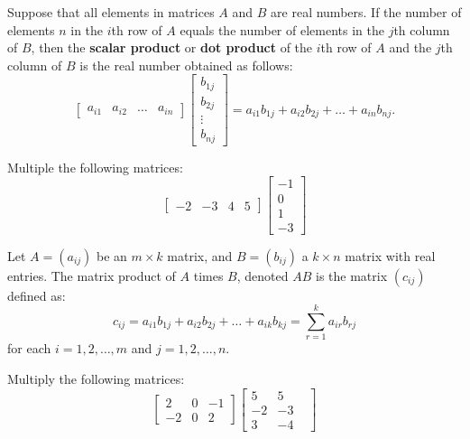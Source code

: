 \documentclass[../mathNotesPreamble]{subfiles}
\begin{document}
  \begin{defn*}
    Suppose that all elements in matrices $A$ and $B$ are real numbers. If the number of elements $n$ in the $i$th row of $A$ equals the number of elements in the $j$th column of $B$, then the \textbf{scalar product} or \textbf{dot product} of the $i$th row of $A$ and the $j$th column of $B$ is the real number obtained as follows:
      \[
        \begin{bmatrix}
          a_{i1}& a_{i2}& \dots& a_{in}
        \end{bmatrix}
        \begin{bmatrix}
          b_{1j}\\ b_{2j}\\ \vdots\\ b_{nj}
        \end{bmatrix}
        = a_{i1} b_{1j}+ a_{i2}b_{2j} + \dots+ a_{in}b_{nj}.
      \]
  \end{defn*}
  \begin{ex*}
    Multiple the following matrices:
      \[
      \begin{bmatrix}
        -2& -3& 4& 5
      \end{bmatrix}
      \begin{bmatrix}
        -1\\ 0\\ 1\\ -3
      \end{bmatrix}
      \]
  \end{ex*}
  \pagebreak

  \begin{defn*}
    Let $A=(a_{ij})$ be an $m\times k$ matrix, and $B=(b_{ij})$ a $k\times n$ matrix with real entries. The matrix product of $A$ times $B$, denoted $AB$ is the matrix $(c_{ij})$ defined as:
      \[c_{ij}=a_{i1}b_{1j}+a_{i2}b_{2j}+\dots+a_{ik}b_{kj}=\sum_{r=1}^k a_{ir}b_{rj}\]
    for each $i=1,2,\dots,m$ and $j=1,2,\dots,n$.
  \end{defn*}
  \begin{ex*}
    Multiply the following matrices:
    \[
      \begin{bmatrix}
        2&0&-1\\
        -2& 0& 2
      \end{bmatrix}
      \begin{bmatrix}
        5& 5& \\
        -2& -3\\
        3& -4
      \end{bmatrix}
    \]
  \end{ex*}

  \pagebreak
\end{document}

